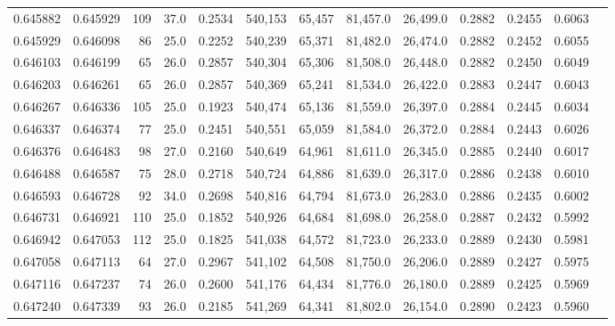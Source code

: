 \begin{tabular}{rrrrrrrrrrrrr}
0.645882 & 0.645929 &   109 & 37.0 &                                     0.2534 & 540,153 &  65,457 &  81,457.0 &  26,499.0 & 0.2882 & 0.2455 & 0.6063 \\
0.645929 & 0.646098 &    86 & 25.0 &                                     0.2252 & 540,239 &  65,371 &  81,482.0 &  26,474.0 & 0.2882 & 0.2452 & 0.6055 \\
0.646103 & 0.646199 &    65 & 26.0 &                                     0.2857 & 540,304 &  65,306 &  81,508.0 &  26,448.0 & 0.2882 & 0.2450 & 0.6049 \\
0.646203 & 0.646261 &    65 & 26.0 &                                     0.2857 & 540,369 &  65,241 &  81,534.0 &  26,422.0 & 0.2883 & 0.2447 & 0.6043 \\
0.646267 & 0.646336 &   105 & 25.0 &                                     0.1923 & 540,474 &  65,136 &  81,559.0 &  26,397.0 & 0.2884 & 0.2445 & 0.6034 \\
0.646337 & 0.646374 &    77 & 25.0 &                                     0.2451 & 540,551 &  65,059 &  81,584.0 &  26,372.0 & 0.2884 & 0.2443 & 0.6026 \\
0.646376 & 0.646483 &    98 & 27.0 &                                     0.2160 & 540,649 &  64,961 &  81,611.0 &  26,345.0 & 0.2885 & 0.2440 & 0.6017 \\
0.646488 & 0.646587 &    75 & 28.0 &                                     0.2718 & 540,724 &  64,886 &  81,639.0 &  26,317.0 & 0.2886 & 0.2438 & 0.6010 \\
0.646593 & 0.646728 &    92 & 34.0 &                                     0.2698 & 540,816 &  64,794 &  81,673.0 &  26,283.0 & 0.2886 & 0.2435 & 0.6002 \\
0.646731 & 0.646921 &   110 & 25.0 &                                     0.1852 & 540,926 &  64,684 &  81,698.0 &  26,258.0 & 0.2887 & 0.2432 & 0.5992 \\
0.646942 & 0.647053 &   112 & 25.0 &                                     0.1825 & 541,038 &  64,572 &  81,723.0 &  26,233.0 & 0.2889 & 0.2430 & 0.5981 \\
0.647058 & 0.647113 &    64 & 27.0 &                                     0.2967 & 541,102 &  64,508 &  81,750.0 &  26,206.0 & 0.2889 & 0.2427 & 0.5975 \\
0.647116 & 0.647237 &    74 & 26.0 &                                     0.2600 & 541,176 &  64,434 &  81,776.0 &  26,180.0 & 0.2889 & 0.2425 & 0.5969 \\
0.647240 & 0.647339 &    93 & 26.0 &                                     0.2185 & 541,269 &  64,341 &  81,802.0 &  26,154.0 & 0.2890 & 0.2423 & 0.5960 \\

\end{tabular}
